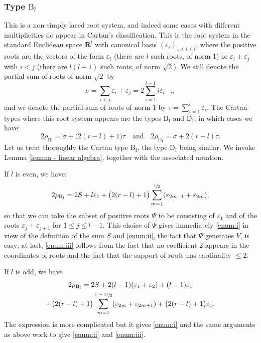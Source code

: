 \documentclass[JEP,XML,SOM,Unicode,published]{cedram}
\newcommand{\psfrac}[2]{\sfrac{(#1)}{#2}}
\newcommand{\rB}{\mathrm{B}}
\newcommand{\rD}{\mathrm{D}}
\newcommand{\rI}{\mathrm{I}}
\newcommand{\RR}{\mathbf{R}}
\theoremstyle{plain}
\theoremstyle{remark}
\theoremstyle{definition}
\begin{document}
\subsubsection*{Type $\rB_l$
\cite[Planche II, p.\,252]{BBK-Lie-4to6}}
This is a non simply laced root system, and indeed some cases with different multiplicities do appear in Cartan's classification.
This is the root system in the standard Euclidean space $\RR^l$ with canonical basis $(\varepsilon_i)_{1 \leqslant i \leqslant l}$, where the positive roots are the vectors of the form $\varepsilon_i$ (there are $l$ such roots, of norm 1) or $\varepsilon_i \pm \varepsilon_j$ with $i<j$ (there are $l(l-1)$ such roots, of norm $\sqrt{2}$).
We still denote the partial sum of roots of norm $\sqrt{2}$ by
\[
\sigma = \sum_{i<j} \varepsilon_i \pm \varepsilon_j = 2 \sum_{i=1}^{l-1} i \varepsilon_{l-i},
\]
and we denote the partial sum of roots of norm $1$ by $\tau = \sum_{i=1}^l \varepsilon_i$.
The Cartan types where this root system appears are the types $\rB_\rI$
and $\rD_\rI$,
in which cases we have:
\[
2 \rho_{\rB_\rI} = \sigma + \bigl(2(r-l) + 1 \bigr) \tau
\quad \text{and} \quad
2 \rho_{\rD_\rI} = \sigma + 2(r-l) \tau.
\]
Let us treat thoroughly the Cartan type $\rB_\rI$, the type $\rD_\rI$ being similar.
We invoke Lemma \ref{lemma - linear algebra}, together with the associated notation.

If $l$ is even, we have:
\[
2 \rho_{\rB_\rI} = 2 S + l \varepsilon_1 + \bigl(2(r-l) + 1 \bigr) \sum_{m=1}^{{\sfrac l2}} (\varepsilon_{2m-1} +\varepsilon_{2m}),
\]
so that we can take the subset of positive roots $\Psi$ to be consisting of $\varepsilon_1$ and of the roots $\varepsilon_{j} + \varepsilon_{j+1}$ for $1 \leqslant j \leqslant l-1$.
This choice of $\Psi$ gives immediately \eqref{enum:i} in view of the definition of the sum $S$ and \eqref{enum:ii}, \ie the fact that $\Psi$ generates $V$, is easy; at last, \eqref{enum:iii} follows from the fact that no coefficient $2$ appears in the coordinates of roots and the fact that the support of roots has cardinality $\leqslant 2$.

If $l$ is odd, we have
\begin{multline*}
2 \rho_{\rB_\rI} = 2 S + 2 (l-1)(\varepsilon_1+\varepsilon_2) + (l-1)\varepsilon_1 \\
+ \bigl(2(r-l) + 1 \bigr) \sum_{m=1}^{\psfrac{l-1}{2}} (\varepsilon_{2m} +\varepsilon_{2m+1}) + \bigl(2(r-l) + 1 \bigr) \varepsilon_1.
\end{multline*}
The expression is more complicated but it gives \eqref{enum:i} and the same arguments as above work to give \eqref{enum:ii} and \eqref{enum:iii}.
\end{document}

